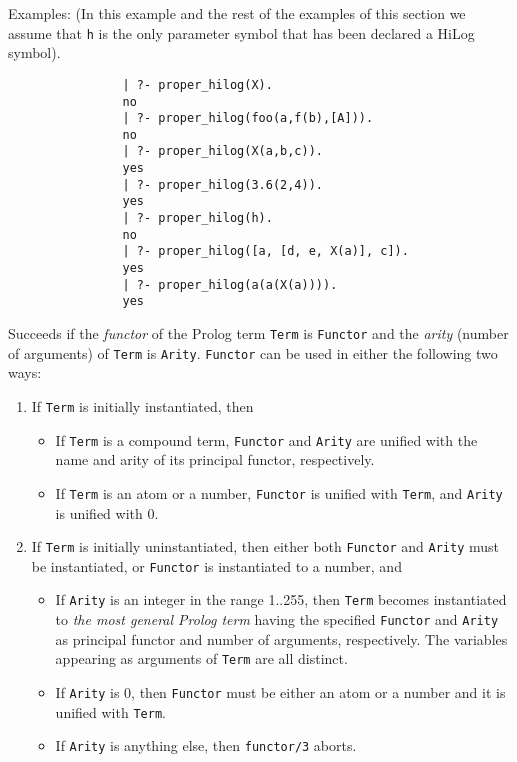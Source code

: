 \begin{description}
    Examples:
    (In this example and the rest of the examples of this section we assume
     that {\tt h} is the only parameter symbol that has been declared a HiLog
     symbol).

    {\footnotesize
     \begin{verbatim}
                | ?- proper_hilog(X).
                no
                | ?- proper_hilog(foo(a,f(b),[A])).
                no
                | ?- proper_hilog(X(a,b,c)).
                yes
                | ?- proper_hilog(3.6(2,4)).
                yes
                | ?- proper_hilog(h).
                no
                | ?- proper_hilog([a, [d, e, X(a)], c]).
                yes
                | ?- proper_hilog(a(a(X(a)))).
                yes
     \end{verbatim}}

    Succeeds if the {\em functor} of the Prolog term {\tt Term} is 
    {\tt Functor} and the {\em arity} (number of arguments) of {\tt Term} is
    {\tt Arity}\@.  {\tt Functor} can be used in either the following two 
    ways:
    \begin{enumerate}
    \item If {\tt Term} is initially instantiated, then
          \begin{itemize}
          \item If {\tt Term} is a compound term, {\tt Functor} and 
                {\tt Arity} are unified with the name and arity of 
                its principal functor, respectively. 
          \item If {\tt Term} is an atom or a number, {\tt Functor} is 
                unified with {\tt Term}, and {\tt Arity} is unified with 0.
          \end{itemize}
    \item If {\tt Term} is initially uninstantiated, then either both 
          {\tt Functor} and {\tt Arity} must be instantiated, or {\tt Functor}
          is instantiated to a number, and
          \begin{itemize}
          \item If {\tt Arity} is an integer in the range 1..255, then
                {\tt Term} becomes instantiated to {\em the most general 
                Prolog term} having the specified {\tt Functor} and 
                {\tt Arity} as principal functor and number of arguments,
                respectively. The variables appearing as arguments of 
                {\tt Term} are all distinct.
          \item If {\tt Arity} is 0, then {\tt Functor} must be either an 
                atom or a number and it is unified with {\tt Term}. 
          \item If {\tt Arity} is anything else, then {\tt functor/3} aborts.
          \end{itemize}
    \end{enumerate}


\end{description}
